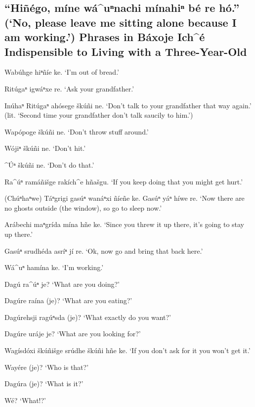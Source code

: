 \documentclass[output=paper]{LSP/langsci}
\begin{document}
\subsection*{``Hiñégo, míne wá\^{ }uⁿnachi mínahiⁿ bé re hó.''\newline
(`No, please leave me sitting alone because I am working.')\newline
Phrases in Báxoje Ich\^{ }é Indispensible to Living with a Three-Year-Old}
\begin{list}{}{} \itemsep1pt \parskip0pt 
\item{Wabúhge hiⁿñíe ke. `I'm out of bread.'}
\item{Ritúgaⁿ igwáⁿxe re. `Ask your grandfather.'}
\item{Inúhaⁿ Ritúgaⁿ ahósege škúñi ne. `Don't talk to your grandfather that way again.' (lit. `Second time your grandfather don't talk saucily to him.')}
\item{Wapópoge škúñi ne. `Don't throw stuff around.'}
\item{Wójiⁿ škúñi ne. `Don't hit.'}
\item{\^{ }\'Uⁿ škúñi ne. `Don't do that.'}
\item{}
\item{Ra\^{ }úⁿ ramáñišge rakích\^{ }e hñašgu. `If you keep doing that you might get hurt.'}
\item{(Chúⁿhaⁿwe) Táⁿgrigi gasúⁿ wanáⁿxi ñíeñe ke. Gasúⁿ yáⁿ híwe re. `Now there are no ghosts outside (the window), so go to sleep now.'}
\item{Arábechi maⁿgrída mína hñe ke. `Since you threw it up there, it's going to stay up there.'}
\item{Gasúⁿ srudhéda asríⁿ jí re. `Ok, now go and bring that back here.'}
\item{}
\item{Wá\^{ }uⁿ hamína ke.	`I'm working.'}
\item{Dagú ra\^{ }úⁿ je? `What are you doing?'}
\item{Dagúre raína (je)? `What are you eating?'}
\item{Dagúrehsji ragúⁿsda (je)? `What exactly do you want?'}
\item{Dagúre uráje je? `What are you looking for?'}
\item{Wagísdóxi škúñišge srúdhe škúñi hñe ke. `If you don't ask for it you won't get it.'}
\item{Wayére (je)? `Who is that?'}
\item{Dagúra (je)? `What is it?'}
\item{Wé? `What!?'}

\end{list}
\end{document}
